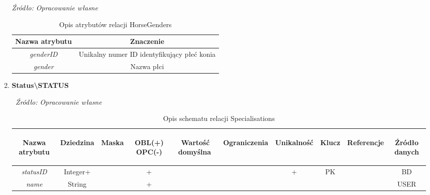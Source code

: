 \documentclass[12pt,twoside]{report}
\begin{document}
\begin{enumerate}[start=10,label={\bfseries REL\textbackslash\arabic*}]
	\begin{table}[H]
		\caption{Opis atrybutów relacji HorseGenders}
		\textit{Źródło: Opracowanie własne}
		\label{HorseGendersAttributeDescription}
		\centering
		\begin{tabular}{|c|c|}
			\hline
			Nazwa atrybutu & Znaczenie \\
			\hline
			\textit{genderID}& Unikalny numer ID identyfikujący płeć konia\\	
			\hline
			\textit{gender}& Nazwa płci\\
			\hline
		\end{tabular}
	\end{table}
	\item \textbf{Status\textbackslash STATUS} 
	\begin{table}[H]
		\caption{Opis schematu relacji Specialisations}
		$\ $
		\textit{Źródło: Opracowanie własne}
		\label{StatusRelationSchema}
		\centering
		\begin{tabular}{|c|c|c|c|c|c|c|c|c|c|}
			\hline
			\begin{sideways}Nazwa atrybutu\end{sideways}& 
			\begin{sideways}Dziedzina \end{sideways}& 
			\begin{sideways}Maska \end{sideways}& 
			\begin{sideways}OBL(+) OPC(-)\end{sideways} & 
			\begin{sideways}Wartość domyślna$\ $\end{sideways}& 
			\begin{sideways}Ograniczenia\end{sideways} &
			\begin{sideways}Unikalność \end{sideways}& 
			\begin{sideways}Klucz \end{sideways}& 
			\begin{sideways}Referencje \end{sideways}&
			\begin{sideways}Źródło danych\end{sideways}\\
			\hline
			\textit{statusID}&Integer+&&+&&&+&PK&&BD\\	
			\hline			
			\textit{name}&String&&+&&&&&&USER\\	
			\hline
		\end{tabular}
	\end{table}
	

\end{enumerate}
\end{document}
